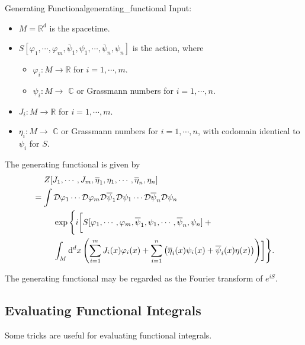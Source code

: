 \documentclass{article}
\begin{document}
\begin{definition}{Generating Functional}{generating_functional}
    Input:
    \begin{itemize}[nosep]
        \item $M = \mathbb{R}^{d}$ is the spacetime.
        \item $S[\varphi_1, \cdots, \varphi_m, \overline{\psi}_1,\psi_1,\cdots,\overline{\psi}_n,\psi_n]$ is the action, where
        \begin{itemize}[nosep]
            \item $\varphi_i: M \rightarrow \mathbb{R}$ for $i = 1,\cdots,m$.
            \item $\psi_i: M \rightarrow$ $\mathbb{C}$ or Grassmann numbers for $i = 1,\cdots, n$.
        \end{itemize}
        \item $J_i: M \rightarrow \mathbb{R}$ for $i = 1,\cdots,m$.
        \item $\eta_i: M \rightarrow$ $\mathbb{C}$ or Grassmann numbers for $i = 1,\cdots, n$, with codomain identical to $\psi_i$ for $S$.
    \end{itemize}
    The generating functional is given by
    \begin{align*}
        &\phantom{{}={}} Z[J_1, \cdots, J_m, \overline{\eta}_1,\eta_1,\cdots,\overline{\eta}_n,\eta_n] \\
        &= \int \mathcal{D}\varphi_1 \cdots \mathcal{D}\varphi_m \mathcal{D} \overline{\psi}_1 \mathcal{D}\psi_1 \cdots \mathcal{D}\overline{\psi}_n \mathcal{D}\psi_n \\
        &\phantom{{}={}\int} \exp\Bigg\{i\bigg[S[\varphi_1, \cdots, \varphi_m, \overline{\psi}_1,\psi_1,\cdots,\overline{\psi}_n,\psi_n] {}+{} \\
        &\phantom{{}={}\int }\int_M \dd{^d x} \qty(\sum_{i=1}^mJ_i(x)\varphi_i(x) + \sum_{i=1}^n \qty(\overline{\eta}_i(x)\psi_i(x) + \overline{\psi}_i(x)\eta(x))) \bigg]\Bigg\}.
    \end{align*}
\end{definition}

The generating functional may be regarded as the Fourier transform of $e^{iS}$.

\subsection{Evaluating Functional Integrals}

Some tricks are useful for evaluating functional integrals.
\end{document}
